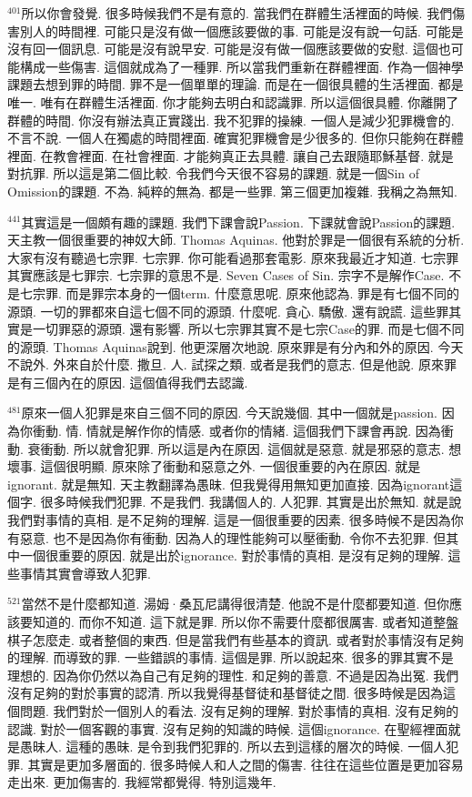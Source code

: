 \documentclass{book}
\begin{document}
$^{401}$所以你會發覺.
很多時候我們不是有意的.
當我們在群體生活裡面的時候.
我們傷害別人的時間裡.
可能只是沒有做一個應該要做的事.
可能是沒有說一句話.
可能是沒有回一個訊息.
可能是沒有說早安.
可能是沒有做一個應該要做的安慰.
這個也可能構成一些傷害.
這個就成為了一種罪.
所以當我們重新在群體裡面.
作為一個神學課題去想到罪的時間.
罪不是一個單單的理論.
而是在一個很具體的生活裡面.
都是唯一.
唯有在群體生活裡面.
你才能夠去明白和認識罪.
所以這個很具體.
你離開了群體的時間.
你沒有辦法真正實踐出.
我不犯罪的操練.
一個人是減少犯罪機會的.
不言不說.
一個人在獨處的時間裡面.
確實犯罪機會是少很多的.
但你只能夠在群體裡面.
在教會裡面.
在社會裡面.
才能夠真正去具體.
讓自己去跟隨耶穌基督.
就是對抗罪.
所以這是第二個比較.
令我們今天很不容易的課題.
就是一個Sin of Omission的課題.
不為.
純粹的無為.
都是一些罪.
第三個更加複雜.
我稱之為無知.

$^{441}$其實這是一個頗有趣的課題.
我們下課會說Passion.
下課就會說Passion的課題.
天主教一個很重要的神奴大師.
Thomas Aquinas.
他對於罪是一個很有系統的分析.
大家有沒有聽過七宗罪.
七宗罪.
你可能看過那套電影.
原來我最近才知道.
七宗罪其實應該是七罪宗.
七宗罪的意思不是.
Seven Cases of Sin.
宗字不是解作Case.
不是七宗罪.
而是罪宗本身的一個term.
什麼意思呢.
原來他認為.
罪是有七個不同的源頭.
一切的罪都來自這七個不同的源頭.
什麼呢.
貪心.
驕傲.
還有說謊.
這些罪其實是一切罪惡的源頭.
還有影響.
所以七宗罪其實不是七宗Case的罪.
而是七個不同的源頭.
Thomas Aquinas說到.
他更深層次地說.
原來罪是有分內和外的原因.
今天不說外.
外來自於什麼.
撒旦.
人.
試探之類.
或者是我們的意志.
但是他說.
原來罪是有三個內在的原因.
這個值得我們去認識.

$^{481}$原來一個人犯罪是來自三個不同的原因.
今天說幾個.
其中一個就是passion.
因為你衝動.
情.
情就是解作你的情感.
或者你的情緒.
這個我們下課會再說.
因為衝動.
衰衝動.
所以就會犯罪.
所以這是內在原因.
這個就是惡意.
就是邪惡的意志.
想壞事.
這個很明顯.
原來除了衝動和惡意之外.
一個很重要的內在原因.
就是ignorant.
就是無知.
天主教翻譯為愚昧.
但我覺得用無知更加直接.
因為ignorant這個字.
很多時候我們犯罪.
不是我們.
我講個人的.
人犯罪.
其實是出於無知.
就是說我們對事情的真相.
是不足夠的理解.
這是一個很重要的因素.
很多時候不是因為你有惡意.
也不是因為你有衝動.
因為人的理性能夠可以壓衝動.
令你不去犯罪.
但其中一個很重要的原因.
就是出於ignorance.
對於事情的真相.
是沒有足夠的理解.
這些事情其實會導致人犯罪.

$^{521}$當然不是什麼都知道.
湯姆·桑瓦尼講得很清楚.
他說不是什麼都要知道.
但你應該要知道的.
而你不知道.
這下就是罪.
所以你不需要什麼都很厲害.
或者知道整盤棋子怎麼走.
或者整個的東西.
但是當我們有些基本的資訊.
或者對於事情沒有足夠的理解.
而導致的罪.
一些錯誤的事情.
這個是罪.
所以說起來.
很多的罪其實不是理想的.
因為你仍然以為自己有足夠的理性.
和足夠的善意.
不過是因為出冤.
我們沒有足夠的對於事實的認清.
所以我覺得基督徒和基督徒之間.
很多時候是因為這個問題.
我們對於一個別人的看法.
沒有足夠的理解.
對於事情的真相.
沒有足夠的認識.
對於一個客觀的事實.
沒有足夠的知識的時候.
這個ignorance.
在聖經裡面就是愚昧人.
這種的愚昧.
是令到我們犯罪的.
所以去到這樣的層次的時候.
一個人犯罪.
其實是更加多層面的.
很多時候人和人之間的傷害.
往往在這些位置是更加容易走出來.
更加傷害的.
我經常都覺得.
特別這幾年.
\end{document}

